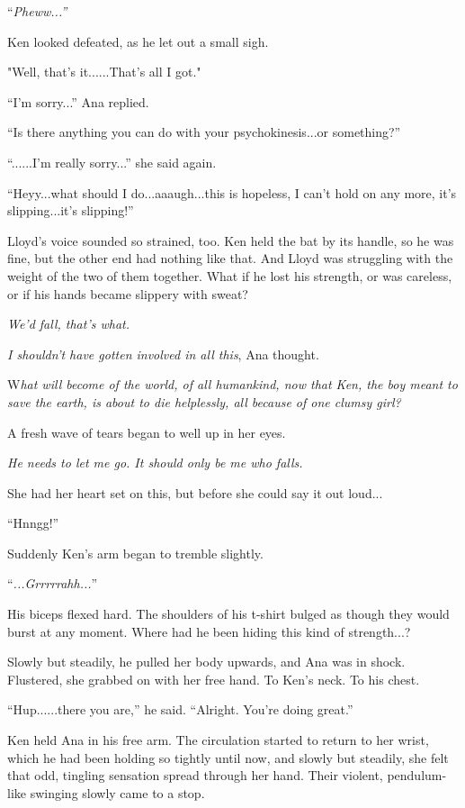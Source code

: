 \documentclass[
]{article}
\begin{document}
``\emph{Pheww...''}

Ken looked defeated, as he let out a small sigh.

"Well, that's it......That's all I got."

``I'm sorry...'' Ana replied.

``Is there anything you can do with your psychokinesis...or something?''

``......I'm really sorry...'' she said again.

``Heyy...what should I do...aaaugh...this is hopeless, I can't hold on
any more, it's slipping...it's slipping!''

Lloyd's voice sounded so strained, too. Ken held the bat by its handle,
so he was fine, but the other end had nothing like that. And Lloyd was
struggling with the weight of the two of them together. What if he lost
his strength, or was careless, or if his hands became slippery with
sweat?

\emph{We'd fall, that's what.}

\emph{I shouldn't have gotten involved in all this}, Ana thought.

W\emph{hat will become of the world, of all humankind, now that Ken, the
boy meant to save the earth, is about to die helplessly, all because of
one clumsy girl?}

A fresh wave of tears began to well up in her eyes.

\emph{He needs to let me go. It should only be me who falls.}

She had her heart set on this, but before she could say it out loud...

``Hnngg!''

Suddenly Ken's arm began to tremble slightly.

``\emph{...Grrrrrahh...}''

His biceps flexed hard. The shoulders of his t-shirt bulged as though
they would burst at any moment. Where had he been hiding this kind of
strength...?

Slowly but steadily, he pulled her body upwards, and Ana was in shock.
Flustered, she grabbed on with her free hand. To Ken's neck. To his
chest.

``Hup......there you are,'' he said. ``Alright. You're doing great.''

Ken held Ana in his free arm. The circulation started to return to her
wrist, which he had been holding so tightly until now, and slowly but
steadily, she felt that odd, tingling sensation spread through her hand.
Their violent, pendulum-like swinging slowly came to a stop.
\end{document}
